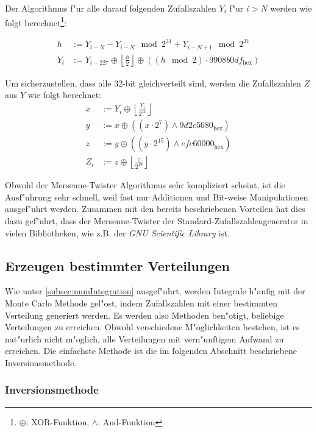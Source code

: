 \begin{refsection}
Der Algorithmus f"ur alle darauf folgenden Zufallszahlen $Y_i$ f"ur
$i>N$ werden wie folgt berechnet\footnote{$\oplus$: XOR-Funktion,
$\wedge$: And-Funktion}:

\begin{align}
	h &:=  Y_{i-N} - Y_{i-N} \mod{2^{31}} + Y_{i-N+1} \mod{2^{31}} \\
	Y_i &:= Y_{i-227} \oplus \left\lfloor \frac{h}{2} \right\rfloor \oplus \left( \left(h \mod{2} \right) \cdot 9908b0df_{\text{hex}}\right)
\end{align}

Um sicherzustellen, dass alle 32-bit gleichverteilt sind, werden die
Zufallszahlen $Z$ aus $Y$ wie folgt berechnet:
\begin{align}
	x &:= Y_{i} \oplus \left\lfloor \frac{Y_i}{2^{11}} \right\rfloor \\
	y &:= x \oplus \left(\left(x \cdot 2^7\right) \wedge 9d2c5680_{\text{hex}} \right) \\
	z &:= y \oplus \left(\left(y \cdot 2^{15}\right) \wedge efc60000_{\text{hex}} \right) \\
	Z_i &:= z \oplus \left\lfloor \frac{z}{2^{18}} \right\rfloor
\end{align}

Obwohl der Mersenne-Twister Algorithmus sehr kompliziert scheint,
ist die Ausf"uhrung sehr schnell, weil fast nur Additionen und
Bit-weise Manipulationen ausgef"uhrt werden. Zusammen mit den bereits
beschriebenen Vorteilen hat dies dazu gef"uhrt, dass der Mersenne-Twister
der Standard-Zufallszahlengenerator in vielen Bibliotheken, wie z.B. der
\textit{GNU Scientific Library} ist.


\subsection{Erzeugen bestimmter Verteilungen}
Wie unter \ref{subsec:numIntegration} ausgef"uhrt, werden Integrale
h"aufig mit der Monte Carlo Methode gel"ost, indem Zufallszahlen mit einer
bestimmten Verteilung generiert werden. Es werden also Methoden ben"otigt,
beliebige Verteilungen zu erreichen. Obwohl verschiedene M"oglichkeiten
bestehen, ist es nat"urlich nicht m"oglich, alle Verteilungen mit
vern"unftigem Aufwand zu erreichen. Die einfachste Methode ist die im
folgenden Abschnitt beschriebene Inversionsmethode.

\subsubsection{Inversionsmethode}


\end{refsection}
